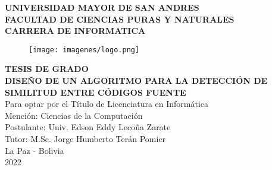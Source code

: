 \begin{titlepage}
    \begin{center}
        {\large \textbf{UNIVERSIDAD MAYOR DE SAN ANDRES}}\\
        \vspace{0.25cm}
        {\large \textbf{FACULTAD DE CIENCIAS PURAS Y NATURALES}}\\
        \vspace{0.25cm}
        {\large \textbf{CARRERA DE INFORMATICA}}\\
        \vspace{0.25cm}
        \begin{figure}[h]
            \centering
            \texttt{[image: imagenes/logo.png]}
        \end{figure}
        \vspace{0.25cm}
        {\large \textbf{TESIS DE GRADO}}\\
        \vspace{0.25cm}
        {\large \textbf{DISEÑO DE UN ALGORITMO PARA LA DETECCIÓN DE SIMILITUD ENTRE CÓDIGOS FUENTE}}\\
        \vspace{0.25cm}
        {\large Para optar por el Título de Licenciatura en Informática}\\
        \vspace{0.25cm}
        {\large Mención: Ciencias de la Computación}\\
        \vspace{0.25cm}
        {\large Postulante: Univ. Edson Eddy Lecoña Zarate}\\
        \vspace{0.25cm}
        {\large Tutor: M.Sc. Jorge Humberto Terán Pomier}\\
        \vspace{0.25cm}
        {\large La Paz - Bolivia}\\
        \vspace{0.25cm}
        {\large 2022}\\
    \end{center}
\end{titlepage}